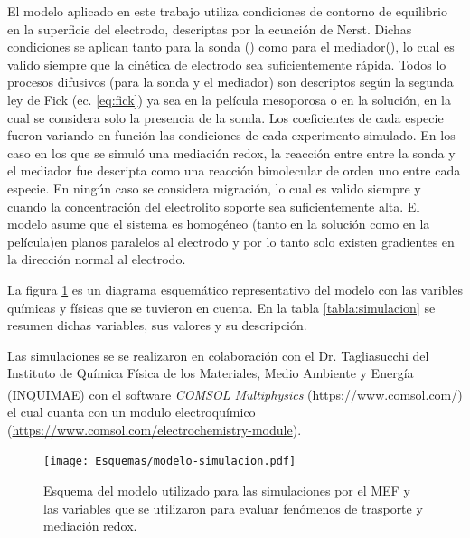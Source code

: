 	 	 El modelo aplicado en este trabajo utiliza condiciones de contorno de equilibrio en la superficie del electrodo, descriptas por la ecuación de Nerst. Dichas condiciones se aplican tanto para la sonda (\fc) como para el mediador(\ru), lo cual es valido siempre que la cinética de electrodo sea suficientemente rápida. Todos lo procesos difusivos (para la sonda y el mediador) son descriptos según la segunda ley de Fick (ec. \ref{eq:fick}) ya sea en la película mesoporosa o en la solución, en la cual se considera solo la presencia de la sonda. Los coeficientes de cada especie fueron variando en función las condiciones de cada experimento simulado. En los caso en los que se simuló una mediación redox, la reacción entre entre la sonda y el mediador fue descripta como una reacción bimolecular de orden uno entre cada especie. En ningún caso se considera migración, lo cual es valido siempre y cuando la concentración del electrolito soporte sea suficientemente alta. El modelo asume que el sistema es homogéneo (tanto en la solución como en la película)en planos paralelos al electrodo y por lo tanto solo existen gradientes en la dirección normal al electrodo. 

	 	 La figura \ref{esq:simulacion} es un diagrama esquemático representativo del modelo con las varibles químicas y físicas que se tuvieron en cuenta. En la tabla \ref{tabla:simulacion} se resumen dichas variables, sus valores y su descripción.

	 	 Las simulaciones se se realizaron en colaboración con el Dr. Tagliasucchi del Instituto de Química Física de los Materiales, Medio Ambiente y Energía (INQUIMAE) con el software \textit{COMSOL Multiphysics\textsuperscript\textregistered} (\url{https://www.comsol.com/}) el cual cuanta con un modulo electroquímico (\url{https://www.comsol.com/electrochemistry-module}).
	 			
	 			 \begin{figure}[ht!]
			 		  \begin{center}
			 		  \texttt{[image: Esquemas/modelo-simulacion.pdf]}
			 		  \caption[Modelos para simulación por MEF]{Esquema del modelo utilizado para las simulaciones por el MEF y las variables que se utilizaron para evaluar fenómenos de trasporte y mediación redox.}
			 		  \label{esq:simulacion}
			 		  \end{center}
			 		  \end{figure}	
	 	 	
